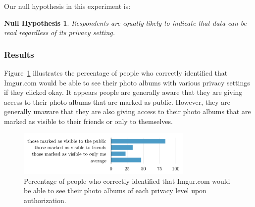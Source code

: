 \documentclass{sig-alternate}
\newtheorem{hypothesis}{Null Hypothesis}
\begin{document}
Our null hypothesis in this experiment is:

\begin{hypothesis}\label{hyp:privacy_setting}
Respondents are equally likely to indicate that data can be read regardless of its privacy setting.
\end{hypothesis}

\subsubsection{Results}


Figure~\ref{figure:privacypercents} illustrates the percentage of people who correctly identified that Imgur.com would be able to see their photo albums with various privacy settings if they clicked okay.
It appears people are generally aware that they are giving access to their photo albums that are marked as public. However, they are generally unaware that they are also giving access to their photo albums that are marked as visible to their friends or only to themselves. 

\begin{figure}[tb!]
  \centering
  \includegraphics[width=8.5cm]{privacy_percents_cosn}
  \caption{Percentage of people who correctly identified that Imgur.com would be able to see their photo albums of each privacy level upon authorization.}
  \label{figure:privacypercents}
\end{figure}
\end{document}
